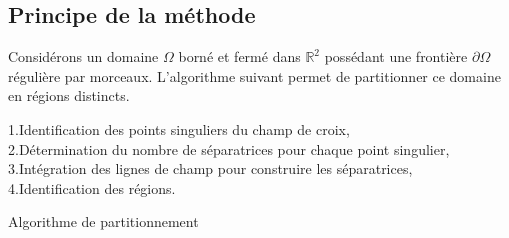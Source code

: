 \subsection{Principe de la méthode}
\label{subsec:principe_methode}

Considérons un domaine $\Omega$ borné et fermé dans $\mathbb{R}^2$ possédant une frontière $\partial\Omega$ régulière par morceaux. L'algorithme suivant permet de partitionner ce domaine en régions distincts.

\vspace{0.5cm}
\begin{algorithm}[H]
\label{alg:algo_main}
\renewcommand{\algorithmcfname}{Algorithme}%
\SetAlgoLined
{}
\vspace{0.2cm}
1.\quad Identification des points singuliers du champ de croix,\\\vspace{0.2cm}
2.\quad Détermination du nombre de séparatrices pour chaque point singulier,\\\vspace{0.2cm}
3.\quad Intégration des lignes de champ pour construire les séparatrices,\\\vspace{0.2cm}
4.\quad Identification des régions.\\\vspace{0.2cm}
\caption{Algorithme de partitionnement}
\end{algorithm}
\vspace{0.5cm}

